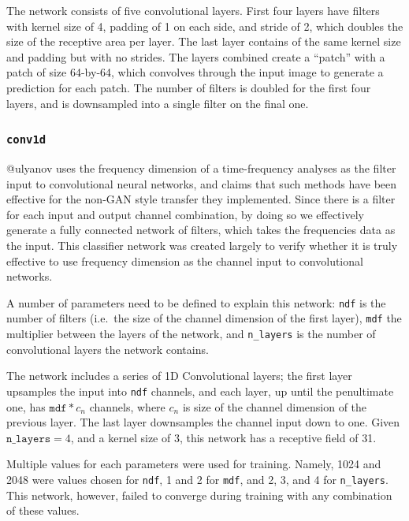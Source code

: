 \documentclass[]{report}
\begin{document}
The network consists of five convolutional layers. First four layers
have filters with kernel size of 4, padding of 1 on each side, and
stride of 2, which doubles the size of the receptive area per layer. The
last layer contains of the same kernel size and padding but with no
strides. The layers combined create a ``patch'' with a patch of size
64-by-64, which convolves through the input image to generate a
prediction for each patch. The number of filters is doubled for the
first four layers, and is downsampled into a single filter on the final
one.

\hypertarget{conv1d}{%
\subsubsection{\texorpdfstring{\texttt{conv1d}}{conv1d}}\label{conv1d}}

@ulyanov uses the frequency dimension of a time-frequency analyses as
the filter input to convolutional neural networks, and claims that such
methods have been effective for the non-GAN style transfer they
implemented. Since there is a filter for each input and output channel
combination, by doing so we effectively generate a fully connected
network of filters, which takes the frequencies data as the input. This
classifier network was created largely to verify whether it is truly
effective to use frequency dimension as the channel input to
convolutional networks.

A number of parameters need to be defined to explain this network:
\texttt{ndf} is the number of filters (i.e.~the size of the channel
dimension of the first layer), \texttt{mdf} the multiplier between the
layers of the network, and \texttt{n\_layers} is the number of
convolutional layers the network contains.

The network includes a series of 1D Convolutional layers; the first
layer upsamples the input into \texttt{ndf} channels, and each layer, up
until the penultimate one, has \(\texttt{mdf} * c_n\) channels, where
\(c_n\) is size of the channel dimension of the previous layer. The last
layer downsamples the channel input down to one. Given
\(\texttt{n\_layers} = 4\), and a kernel size of 3, this network has a
receptive field of 31.

Multiple values for each parameters were used for training. Namely, 1024
and 2048 were values chosen for \texttt{ndf}, 1 and 2 for \texttt{mdf},
and 2, 3, and 4 for \texttt{n\_layers}. This network, however, failed to
converge during training with any combination of these values.
\end{document}
